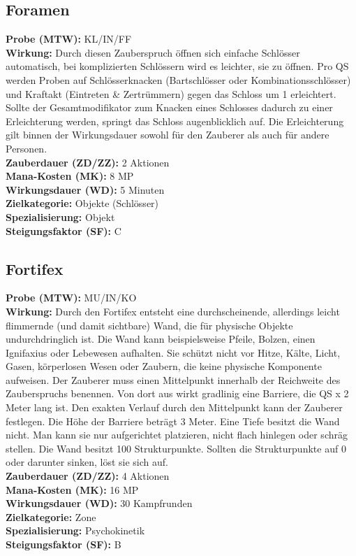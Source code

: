 \subsection{Foramen}
\label{chap:foramen}
\textbf{Probe (MTW):} KL/IN/FF \\
\textbf{Wirkung:} Durch diesen Zauberspruch öffnen sich einfache Schlösser automatisch, bei komplizierten Schlössern wird es leichter, sie zu öffnen. Pro QS werden Proben auf Schlösserknacken (Bartschlösser oder Kombinationsschlösser) und Kraftakt (Eintreten \& Zertrümmern) gegen das Schloss um 1 erleichtert. Sollte der Gesamtmodifikator zum Knacken eines Schlosses dadurch zu einer Erleichterung werden, springt das Schloss augenblicklich auf. Die Erleichterung gilt binnen der Wirkungsdauer sowohl für den Zauberer als auch für andere Personen. \\
\textbf{Zauberdauer (ZD/ZZ):} 2 Aktionen \\
\textbf{Mana-Kosten (MK):} 8 MP \\
\textbf{Wirkungsdauer (WD):} 5 Minuten \\
\textbf{Zielkategorie:} Objekte (Schlösser) \\
\textbf{Spezialisierung:} Objekt \\
\textbf{Steigungsfaktor (SF):} C


\subsection{Fortifex}
\label{chap:fortifex}
\textbf{Probe (MTW):} MU/IN/KO \\
\textbf{Wirkung:} Durch den Fortifex entsteht eine durchscheinende, allerdings leicht flimmernde (und damit sichtbare) Wand, die für physische Objekte undurchdringlich ist. Die Wand kann beispielsweise Pfeile, Bolzen, einen Ignifaxius oder Lebewesen aufhalten. Sie schützt nicht vor Hitze, Kälte, Licht, Gasen, körperlosen Wesen oder Zaubern, die keine physische Komponente aufweisen. Der Zauberer muss einen Mittelpunkt innerhalb der Reichweite des Zauberspruchs benennen. Von dort aus wirkt gradlinig eine Barriere, die QS x 2 Meter lang ist. Den exakten Verlauf durch den Mittelpunkt kann der Zauberer festlegen. Die Höhe der Barriere beträgt 3 Meter. Eine Tiefe besitzt die Wand nicht. Man kann sie nur aufgerichtet platzieren, nicht flach hinlegen oder schräg stellen. Die Wand besitzt 100 Strukturpunkte. Sollten die Strukturpunkte auf 0 oder darunter sinken, löst sie sich auf. \\
\textbf{Zauberdauer (ZD/ZZ):} 4 Aktionen \\
\textbf{Mana-Kosten (MK):} 16 MP \\
\textbf{Wirkungsdauer (WD):} 30 Kampfrunden \\
\textbf{Zielkategorie:} Zone \\
\textbf{Spezialisierung:} Psychokinetik \\
\textbf{Steigungsfaktor (SF):} B


